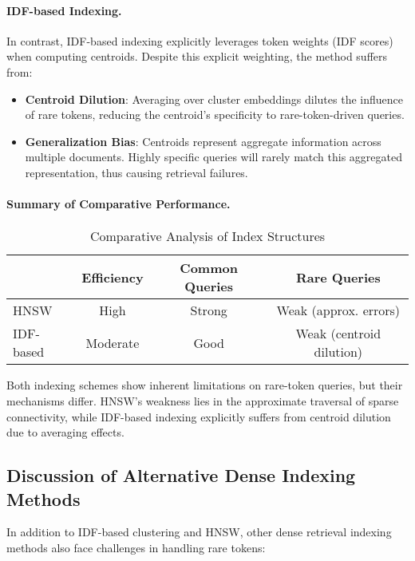 \documentclass[sigconf,review]{acmart}
\begin{document}
\paragraph{IDF-based Indexing.}
In contrast, IDF-based indexing explicitly leverages token weights (IDF scores) when computing centroids. Despite this explicit weighting, the method suffers from:

\begin{itemize}
  \item \textbf{Centroid Dilution}: Averaging over cluster embeddings dilutes the influence of rare tokens, reducing the centroid's specificity to rare-token-driven queries.
  \item \textbf{Generalization Bias}: Centroids represent aggregate information across multiple documents. Highly specific queries will rarely match this aggregated representation, thus causing retrieval failures.
\end{itemize}

\paragraph{Summary of Comparative Performance.}
\begin{table}[h!]
  \centering
  \begin{tabular}{lccc}
    \toprule
    & Efficiency & Common Queries & Rare Queries \\
    \midrule
    HNSW & High & Strong & Weak (approx. errors) \\
    IDF-based & Moderate & Good & Weak (centroid dilution) \\
    \bottomrule
  \end{tabular}
  \caption{Comparative Analysis of Index Structures}
  \label{tab:comparison}
\end{table}

Both indexing schemes show inherent limitations on rare-token queries, but their mechanisms differ. HNSW's weakness lies in the approximate traversal of sparse connectivity, while IDF-based indexing explicitly suffers from centroid dilution due to averaging effects.

\subsection{Discussion of Alternative Dense Indexing Methods}

In addition to IDF-based clustering and HNSW, other dense retrieval indexing methods also face challenges in handling rare tokens:
\end{document}
